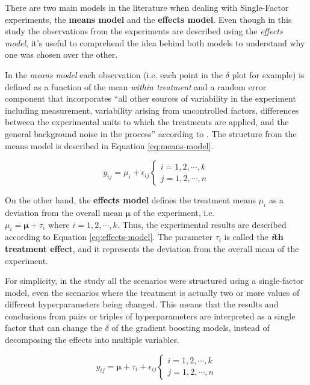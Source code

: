 There are two main models in the literature when dealing with Single-Factor experiments, the \textbf{means model} and the \textbf{effects model}. Even though in this study the observations from the experiments are described using the \textit{effects model}, it's useful to comprehend the idea behind both models to understand why one was chosen over the other.

In the \textit{means model} each observation (i.e. each point in the $\delta$ plot for example) is defined as a function of the mean \textit{within treatment} and a random error component that incorporates ``all other sources of variability in the experiment including measurement, variability arising from uncontrolled factors, differences between the experimental units to which the treatments are applied, and the general background noise in the process'' according to \cite{montgomery2017design}. The structure from the means model is described in Equation \ref{eq:means-model}.

\begin{equation}\label{eq:means-model}
    y_{ij} = \mu_i + \epsilon_{ij}
    \begin{cases}
        i = 1, 2, \cdots , k\\
        j = 1, 2, \cdots, n
    \end{cases}
\end{equation}

On the other hand, the \textbf{effects model} defines the treatment means $\mu_i$ as a deviation from the overall mean $\bm{\mu}$ of the experiment, i.e. $\mu_i = \bm{\mu}+ \tau_i \text{ where } i = 1, 2, \cdots, k$. Thus, the experimental results are described according to Equation \ref{eq:effects-model}. The parameter $\tau_i$ is called the \textbf{\textit{i}th treatment effect}, and it represents the deviation from the overall mean of the experiment.

For simplicity, in the study all the scenarios were structured using a single-factor model, even the scenarios where the treatment is actually two or more values of different hyperparameters being changed. This means that the results and conclusions from pairs or triples of hyperparameters are interpreted as a single factor that can change the $\delta$ of the gradient boosting models, instead of decomposing the effects into multiple variables.

\begin{equation}\label{eq:effects-model}
    y_{ij} = \bm{\mu} + \tau_i + \epsilon_{ij}
    \begin{cases}
        i = 1, 2, \cdots , k\\
        j = 1, 2, \cdots, n
    \end{cases}
\end{equation}

